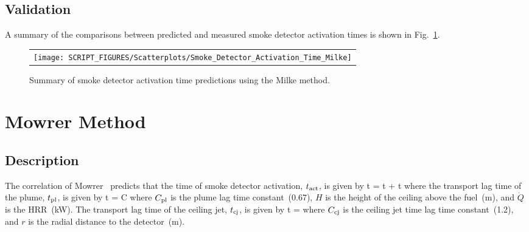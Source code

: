 

\clearpage


\subsection*{Validation}

A summary of the comparisons between predicted and measured smoke detector activation times is shown in Fig.~\ref{Smoke_Detector_Activation_Summary_Milke}.

\begin{figure}[!ht]
\begin{center}
\begin{tabular}{l}
\texttt{[image: SCRIPT\_FIGURES/Scatterplots/Smoke\_Detector\_Activation\_Time\_Milke]}
\end{tabular}
\end{center}
\caption[Summary of smoke detector activation time predictions (Milke)]
{Summary of smoke detector activation time predictions using the Milke method.}
\label{Smoke_Detector_Activation_Summary_Milke}
\end{figure}


\clearpage


\section{Mowrer Method}

\subsection*{Description}

The correlation of Mowrer~\cite{Mowrer:1} predicts that the time of smoke detector activation, $t\sb{act}$, is given by
\be
t = t + t
\label{eq:Mowrer}
\ee
where the transport lag time of the plume, $t\sb{pl}$, is given by
\be
t = C 
\label{eq:Mowrer_tpl}
\ee
where $C\sb{pl}$ is the plume lag time constant~(0.67), $H$ is the height of the ceiling above the fuel~(\si{m}), and $\dot Q$ is the HRR~(\si{kW}).
The transport lag time of the ceiling jet, $t\sb{cj}$, is given by
\be
t =  
\label{eq:Mowrer_tcj}
\ee
where $C\sb{cj}$ is the ceiling jet time lag time constant~(1.2), and $r$ is the radial distance to the detector~(\si{m}).

